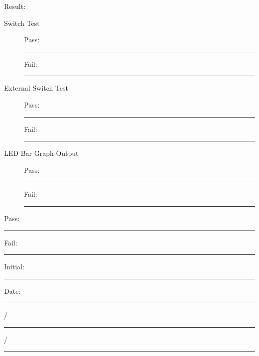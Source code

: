 \vfill
{\Large Result:}\\
\begin{description}
\item[Switch Test] \hfill Pass: \rule{1cm}{0.15mm} \hspace{1cm} Fail: \rule{1cm}{0.15mm}
\item[External Switch Test] \hfill Pass: \rule{1cm}{0.15mm} \hspace{1cm} Fail: \rule{1cm}{0.15mm}
\item[LED Bar Graph Output] \hfill Pass: \rule{1cm}{0.15mm} \hspace{1cm} Fail: \rule{1cm}{0.15mm}
\end{description}
{\large Pass: \rule{1cm}{0.15mm} \hspace{1cm} Fail: \rule{1cm}{0.15mm}} \hfill Initial: \rule{2cm}{0.15mm} \hspace{1cm} Date: \rule{0.5cm}{0.15mm}/\rule{0.5cm}{0.15mm}/\rule{1cm}{0.15mm}\\[5pt]

